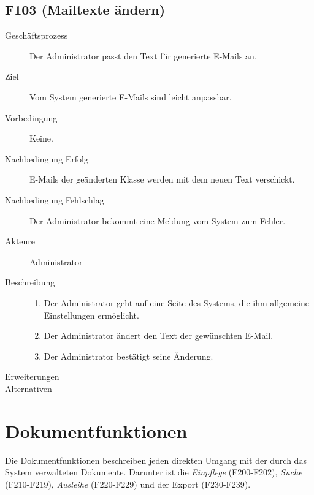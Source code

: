 \subsection{F103 (Mailtexte ändern)}
\begin{description}
  \item[Geschäftsprozess]Der Administrator passt den Text für generierte E-Mails an.
  \item[Ziel]Vom System generierte E-Mails sind leicht anpassbar.
  \item[Vorbedingung]Keine.
  \item[Nachbedingung Erfolg]E-Mails der geänderten Klasse werden mit dem neuen Text verschickt.
  \item[Nachbedingung Fehlschlag]Der Administrator bekommt eine Meldung vom System zum Fehler.
  \item[Akteure]Administrator
  \item[Beschreibung]\hfill
    \begin{enumerate}
      \item Der Administrator geht auf eine Seite des Systems, die ihm allgemeine Einstellungen ermöglicht.
      \item Der Administrator ändert den Text der gewünschten E-Mail.
      \item Der Administrator bestätigt seine Änderung.
    \end{enumerate}
  \item[Erweiterungen]
  \item[Alternativen]
\end{description}


\section{Dokumentfunktionen}
Die Dokumentfunktionen beschreiben jeden direkten Umgang mit der durch das System verwalteten Dokumente. Darunter ist die \emph{Einpflege} (F200-F202), \emph{Suche} (F210-F219), \emph{Ausleihe} (F220-F229) und der Export (F230-F239).
